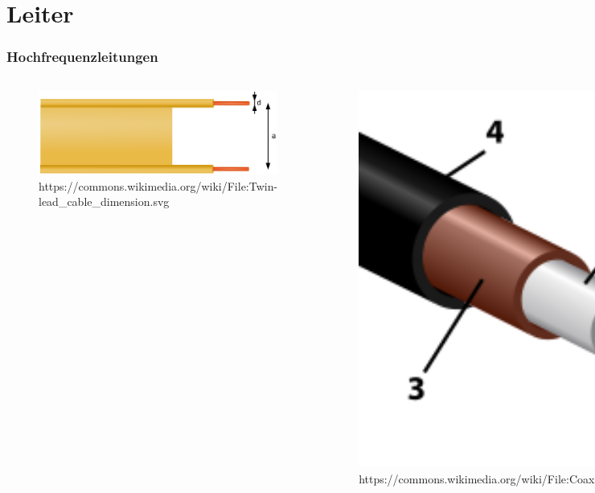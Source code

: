 \section*{Leiter}
\begin{frame}
\frametitle{Hochfrequenzleitungen}
\begin{center}
  \begin{columns}
      \begin{center}
	\begin{figure}
	\includegraphics[width=1\textwidth,height=.5\textwidth,keepaspectratio]{e10/parallel.png}
                        {https://commons.wikimedia.org/wiki/File:Twin-lead_cable_dimension.svg}{\ccbysa}
      \end{figure}
      \end{center}
      \begin{center}
	\begin{figure}
	\includegraphics[width=1\textwidth,height=.5\textwidth,keepaspectratio]{e10/coax.png}
                  {https://commons.wikimedia.org/wiki/File:Coaxial_cable_cutaway_new.svg}{\ccby}
      \end{figure}
      \end{center}
  \end{columns}
\end{center}
\end{frame}

